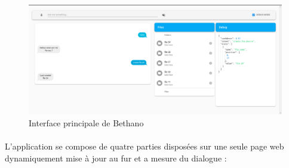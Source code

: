\begin{figure}[H]
	\centering
	\includegraphics[width=.8\linewidth]{images/Realisation/app_wiss.png} 
	\caption{Interface principale de Bethano}
\end{figure} 

\paragraph{}
L'application se compose de quatre parties disposées sur une seule page web dynamiquement mise à jour au fur et a mesure du dialogue :

